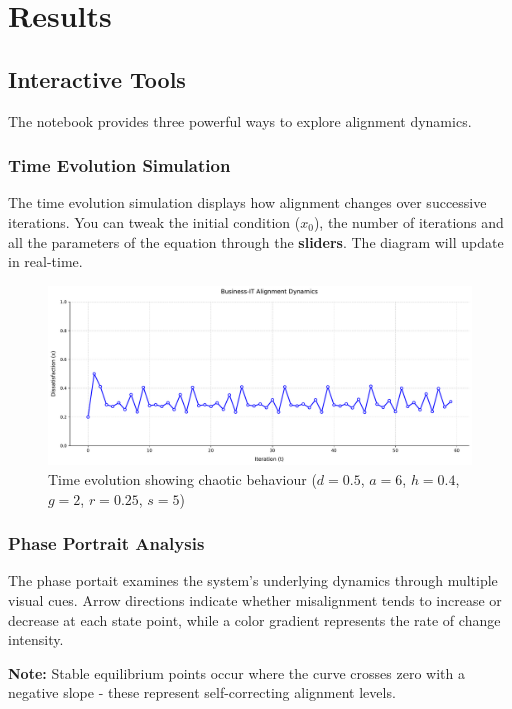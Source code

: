 \documentclass[a4paper, 10pt]{article}
\begin{document}
\section{Results}
\subsection{Interactive Tools}
The notebook provides three powerful ways to explore alignment dynamics.

\subsubsection{Time Evolution Simulation}
The time evolution simulation displays how alignment changes over successive iterations.
You can tweak the initial condition ($x_0$), the number of iterations and all the parameters of the equation through the \textbf{sliders}.
The diagram will update in real-time.

\begin{figure}[h]
	\centering
	\includegraphics[width=1\textwidth]{../images/results/res-int-1.pdf}
	\caption{Time evolution showing chaotic behaviour ($d = 0.5$, $a = 6$, $h = 0.4$, $g = 2$, $r = 0.25$, $s = 5$)}
	\label{fig:time_sim}
\end{figure}

\subsubsection{Phase Portrait Analysis}
The phase portait examines the system's underlying dynamics through multiple visual cues. Arrow directions indicate whether misalignment tends to increase or decrease at each state point, while a color gradient represents the rate of change intensity.

\textbf{Note:} Stable equilibrium points occur where the curve crosses zero with a negative slope - these represent self-correcting alignment levels.
\end{document}
